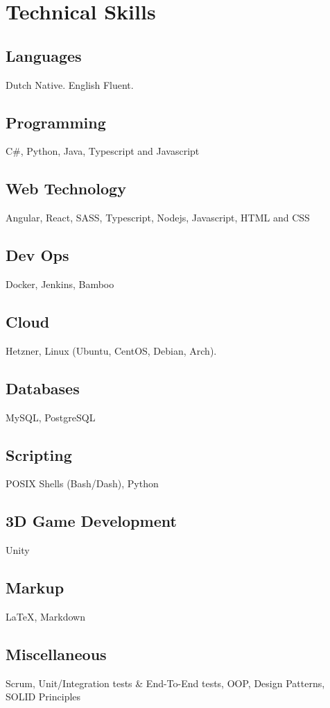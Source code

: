 \section{Technical Ski\textcolor{mycolor}{lls}}
  \subsection{Languages} 
  Dutch \textcolor{mycolor}{Native}. English \textcolor{mycolor}{Fluent}.
  \subsection{Programming}
    C\#, Python, Java, Typescript and Javascript
  \subsection{Web Technology}
    Angular, React, SASS, Typescript, Nodejs, Javascript, HTML and CSS
  \subsection{Dev Ops}
    Docker, Jenkins, Bamboo
  \subsection{Cloud}
    Hetzner, Linux (Ubuntu, CentOS, Debian, Arch).
  \subsection{Databases}
    MySQL, PostgreSQL
  \subsection{Scripting}
    POSIX Shells (Bash/Dash), Python
  \subsection{3D Game Development}
    Unity
  \subsection{Markup}
    {\LaTeX}, Markdown
  \subsection{Miscellaneous}
    Scrum, Unit/Integration tests \& End-To-End tests, OOP, Design Patterns, SOLID Principles